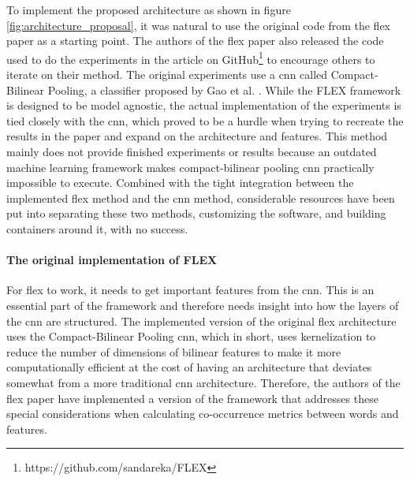             To implement the proposed architecture as shown in figure \ref{fig:architecture_proposal}, it was natural to use the original code from the \gls{flex} paper as a starting point.
            The authors of the \gls{flex} paper also released the code used to do the experiments in the article on GitHub\footnote{https://github.com/sandareka/FLEX} to encourage others to iterate on their method. The original experiments use a \gls{cnn} called Compact-Bilinear Pooling, a classifier proposed by Gao et al. \cite{gaoCompactBilinearPooling2016}. While the FLEX framework is designed to be model agnostic, the actual implementation of the experiments is tied closely with the \gls{cnn}, which proved to be a hurdle when trying to recreate the results in the paper and expand on the architecture and features. 
            This method mainly does not provide finished experiments or results because an outdated machine learning framework makes compact-bilinear pooling \gls{cnn} practically impossible to execute. 
            Combined with the tight integration between the implemented \gls{flex} method and the \gls{cnn} method, considerable resources have been put into separating these two methods, customizing the software, and building containers around it, with no success.
    
            
            \paragraph{The original implementation of FLEX\\}
            For \gls{flex} to work, it needs to get important features from the \gls{cnn}. This is an essential part of the framework and therefore needs insight into how the layers of the \gls{cnn} are structured.
            The implemented version of the original \gls{flex} architecture uses the Compact-Bilinear Pooling \gls{cnn}, which in short, uses kernelization to reduce the number of dimensions of bilinear features to make it more computationally efficient at the cost of having an architecture that deviates somewhat from a more traditional \gls{cnn} architecture. Therefore, the authors of the \gls{flex} paper have implemented a version of the framework that addresses these special considerations when calculating co-occurrence metrics between words and features. 
        

